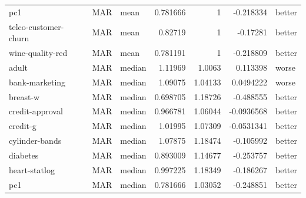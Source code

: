 \begin{table}[ht]
\begin{tabular}{lllrrrl}
 pc1                  & MAR         & mean             &                                 0.781666 &                             1        &                    -0.218334   & better               \\
 telco-customer-churn & MAR         & mean             &                                 0.82719  &                             1        &                    -0.17281    & better               \\
 wine-quality-red     & MAR         & mean             &                                 0.781191 &                             1        &                    -0.218809   & better               \\
 adult                & MAR         & median           &                                 1.11969  &                             1.0063   &                     0.113398   & worse                \\
 bank-marketing       & MAR         & median           &                                 1.09075  &                             1.04133  &                     0.0494222  & worse                \\
 breast-w             & MAR         & median           &                                 0.698705 &                             1.18726  &                    -0.488555   & better               \\
 credit-approval      & MAR         & median           &                                 0.966781 &                             1.06044  &                    -0.0936568  & better               \\
 credit-g             & MAR         & median           &                                 1.01995  &                             1.07309  &                    -0.0531341  & better               \\
 cylinder-bands       & MAR         & median           &                                 1.07875  &                             1.18474  &                    -0.105992   & better               \\
 diabetes             & MAR         & median           &                                 0.893009 &                             1.14677  &                    -0.253757   & better               \\
 heart-statlog        & MAR         & median           &                                 0.997225 &                             1.18349  &                    -0.186267   & better               \\
 pc1                  & MAR         & median           &                                 0.781666 &                             1.03052  &                    -0.248851   & better               \\

\end{tabular}
\end{table}
